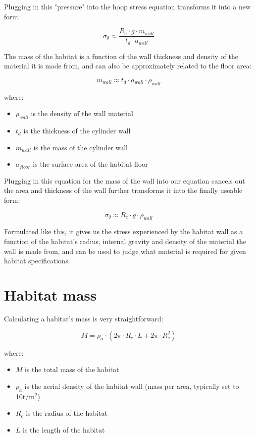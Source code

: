 \documentclass[a4paper]{article}
\begin{document}
	Plugging in this "pressure" into the hoop stress equation transforms it into a new form:
	
	$$ \sigma_\theta \approx \frac{R_c \cdot g \cdot m_{wall}}{t_d \cdot a_{wall}} $$
	
	The mass of the habitat is a function of the wall thickness and density of the material it is made from, and can also be approximately related to the floor area:
	
	$$ m_{wall} \approx t_d \cdot a_{wall} \cdot \rho_{wall}$$
	
	where:
	
	\begin{itemize}
		\item $\rho_{wall}$ is the density of the wall material
		
		\item $t_d$ is the thickness of the cylinder wall
		
		\item $m_{wall}$ is the mass of the cylinder wall
		
		\item $a_{floor}$ is the surface area of the habitat floor
	\end{itemize}
	
	Plugging in this equation for the mass of the wall into our equation cancels out the area and thickness of the wall further transforms it into the finally useable form:
	
	$$ \sigma_\theta \approx R_c \cdot g \cdot \rho_{wall} $$
	
	Formulated like this, it gives us the stress experienced by the habitat wall as a function of the habitat's radius, internal gravity and density of the material the wall is made from, and can be used to judge what material is required for given habitat specifications.
	
	\pagebreak
	
	\section{Habitat mass}
	
	Calculating a habitat's mass is very straightforward:
	
	$$ M = \rho_a \cdot (2\pi \cdot R_c \cdot L + 2 \pi \cdot R_c^2) $$
	
	where:
	
	\begin{itemize}
		\item $M$ is the total mass of the habitat
		
		\item $\rho_a$ is the aerial density of the habitat wall (mass per area, typically set to 10t/m$^2$)
		
		\item $R_c$ is the radius of the habitat
		
		\item $L$ is the length of the habitat
	\end{itemize}
	
\end{document}
